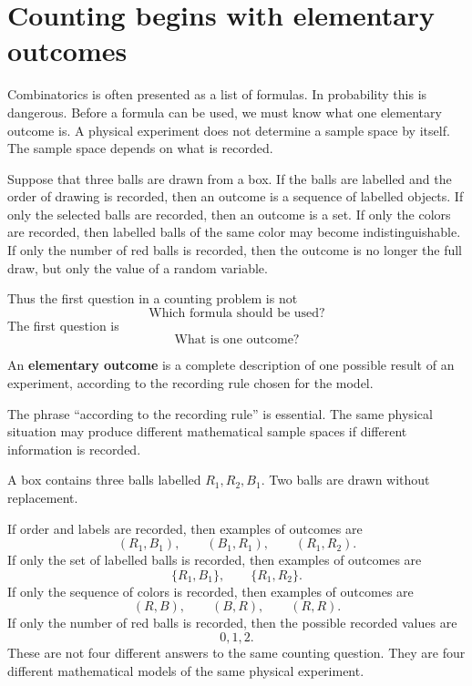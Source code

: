 \section{Counting begins with elementary outcomes}

Combinatorics is often presented as a list of formulas. In probability this is dangerous. Before a formula can be used, we must know what one elementary outcome is. A physical experiment does not determine a sample space by itself. The sample space depends on what is recorded.

Suppose that three balls are drawn from a box. If the balls are labelled and the order of drawing is recorded, then an outcome is a sequence of labelled objects. If only the selected balls are recorded, then an outcome is a set. If only the colors are recorded, then labelled balls of the same color may become indistinguishable. If only the number of red balls is recorded, then the outcome is no longer the full draw, but only the value of a random variable.

Thus the first question in a counting problem is not
\[
\text{Which formula should be used?}
\]
The first question is
\[
\text{What is one outcome?}
\]

\begin{definitionbox}
An \textbf{elementary outcome} is a complete description of one possible result of an experiment, according to the recording rule chosen for the model.
\end{definitionbox}

The phrase ``according to the recording rule'' is essential. The same physical situation may produce different mathematical sample spaces if different information is recorded.

\begin{examplebox}
A box contains three balls labelled \(R_1,R_2,B_1\). Two balls are drawn without replacement.

If order and labels are recorded, then examples of outcomes are
\[
(R_1,B_1),\qquad (B_1,R_1),\qquad (R_1,R_2).
\]
If only the set of labelled balls is recorded, then examples of outcomes are
\[
\{R_1,B_1\},\qquad \{R_1,R_2\}.
\]
If only the sequence of colors is recorded, then examples of outcomes are
\[
(R,B),\qquad (B,R),\qquad (R,R).
\]
If only the number of red balls is recorded, then the possible recorded values are
\[
0,1,2.
\]
These are not four different answers to the same counting question. They are four different mathematical models of the same physical experiment.
\end{examplebox}

